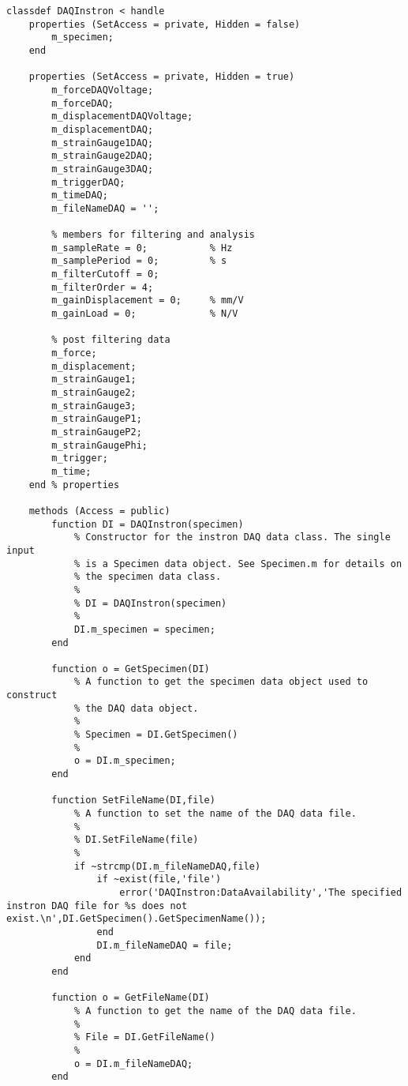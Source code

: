 \begin{lstlisting}
classdef DAQInstron < handle
    properties (SetAccess = private, Hidden = false)
        m_specimen;    
    end

    properties (SetAccess = private, Hidden = true)
        m_forceDAQVoltage;
        m_forceDAQ;
        m_displacementDAQVoltage;
        m_displacementDAQ;
        m_strainGauge1DAQ;
        m_strainGauge2DAQ;
        m_strainGauge3DAQ;
        m_triggerDAQ;
        m_timeDAQ;
        m_fileNameDAQ = '';
        
        % members for filtering and analysis
        m_sampleRate = 0;           % Hz
        m_samplePeriod = 0;         % s
        m_filterCutoff = 0;
        m_filterOrder = 4;
        m_gainDisplacement = 0;     % mm/V
        m_gainLoad = 0;             % N/V        
        
        % post filtering data
        m_force;
        m_displacement;
        m_strainGauge1;
        m_strainGauge2;
        m_strainGauge3;
        m_strainGaugeP1;
        m_strainGaugeP2;
        m_strainGaugePhi;
        m_trigger;
        m_time;
    end % properties
    
    methods (Access = public)
        function DI = DAQInstron(specimen)
            % Constructor for the instron DAQ data class. The single input
            % is a Specimen data object. See Specimen.m for details on
            % the specimen data class.
            %
            % DI = DAQInstron(specimen)
            %            
            DI.m_specimen = specimen;
        end
        
        function o = GetSpecimen(DI)
            % A function to get the specimen data object used to construct
            % the DAQ data object.
            %
            % Specimen = DI.GetSpecimen()
            %
            o = DI.m_specimen;
        end
        
        function SetFileName(DI,file)
            % A function to set the name of the DAQ data file.
            %
            % DI.SetFileName(file)
            %
            if ~strcmp(DI.m_fileNameDAQ,file)
                if ~exist(file,'file')
                    error('DAQInstron:DataAvailability','The specified instron DAQ file for %s does not exist.\n',DI.GetSpecimen().GetSpecimenName());
                end
                DI.m_fileNameDAQ = file;
            end
        end

        function o = GetFileName(DI)
            % A function to get the name of the DAQ data file.
            %
            % File = DI.GetFileName()
            %
            o = DI.m_fileNameDAQ;
        end
        

\end{lstlisting}
